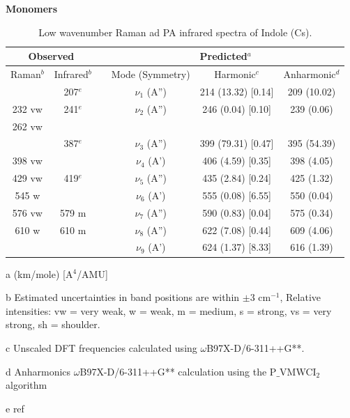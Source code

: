 
	
	\textbf{Monomers}
	
	\begin{table}[H]
		\caption{Low wavenumber Raman ad PA infrared spectra of Indole (Cs).}
		\begin{center}
		\begin{threeparttable}
		\begin{tabular}{c c c c c c}
			\hline
			\multicolumn{ 2}{c}{Observed} & \multicolumn{1}{c}{} & \multicolumn{ 3}{c}{Predicted$^{a}$} \\ \hline
			Raman$^{b}$ & \multicolumn{1}{c}{Infrared$^{b}$} &  & \multicolumn{1}{c}{Mode (Symmetry)} & \multicolumn{1}{c}{Harmonic$^{c}$} & Anharmonic$^{d}$ \\ \hline
			& 207$^{e}$ &  & $\nu_{1}$ (A”) & 214 (13.32) [0.14] & 209 (10.02) \\ 
			232 vw & 241$^{e}$ &  &$\nu_{2}$ (A”) & 246 (0.04) [0.10] & 239 (0.06) \\ 
			262 vw &  &  &  &  &  \\ 
			& 387$^{e}$ &  & $\nu_{3}$ (A”) & 399 (79.31) [0.47] & 395 (54.39) \\ 
			398 vw &  &  & $\nu_{4}$ (A’) & 406 (4.59) [0.35] & 398 (4.05) \\ 
			429 vw & 419$^{e}$&  & $\nu_{5}$ (A”) & 435 (2.84) [0.24] & 425 (1.32) \\ 
			545 w &  &  & $\nu_{6}$ (A’) & 555 (0.08) [6.55] & 550 (0.04) \\ 
			576 vw & \multicolumn{1}{c}{579 m} &  & $\nu_{7}$ (A”) & 590 (0.83) [0.04] & 575 (0.34) \\ 
			610 w & \multicolumn{1}{c}{610 m} &  & $\nu_{8}$ (A”)  & 622 (7.08) [0.44] & 609 (4.06) 
			\\ 
			\multicolumn{1}{l}{} &  &  & $\nu_{9}$ (A’)
			& 624 (1.37) [8.33]
			& 616 (1.39)
			\\ \hline
		\end{tabular}
		
			\begin{tablenotes}
				\item[a] (km/mole) [A$^{4}$/AMU]
				\item[b] Estimated uncertainties in band positions are within $\pm$3 cm$^{-1}$, Relative intensities: vw = very weak, w = weak, m = medium, s = strong, vs = very strong, sh = shoulder.
				\item[c] Unscaled DFT frequencies calculated using $\omega$B97X-D/6-311++G**.
				\item[d] Anharmonics $\omega$B97X-D/6-311++G** calculation using the P$\_$VMWCI$_{2}$ algorithm\item[e] ref
			\end{tablenotes}
		\end{threeparttable}
	\end{center}
		\label{lowfreq-Indole}
	\end{table}
	
